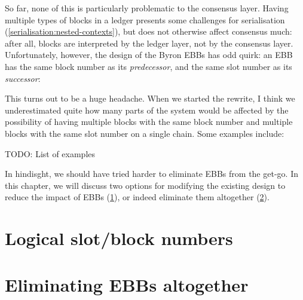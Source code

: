 So far, none of this is particularly problematic to the consensus layer. Having
multiple types of blocks in a ledger presents some challenges for serialisation
(\cref{serialisation:nested-contexts}), but does not otherwise affect consensus
much: after all, blocks are interpreted by the ledger layer, not by the
consensus layer. Unfortunately, however, the design of the Byron EBBs has odd
quirk: an EBB has the same block number as its \emph{predecessor}, and the same
slot number as its \emph{successor}:
%
\begin{center}
\end{center}
%
This turns out to be a huge headache. When we started the rewrite, I think we
underestimated quite how many parts of the system would be affected by the
possibility of having multiple blocks with the same block number and
multiple blocks with the same slot number on a single chain. Some examples
include:

TODO: List of examples

In hindisght, we should have tried harder to eliminate EBBs from the get-go. In
this chapter, we will discuss two options for modifying the existing design to
reduce the impact of EBBs (\cref{ebbs:logical}), or indeed eliminate them
altogether (\cref{ebbs:elimination}).

\section{Logical slot/block numbers}
\label{ebbs:logical}

\section{Eliminating EBBs altogether}
\label{ebbs:elimination}









